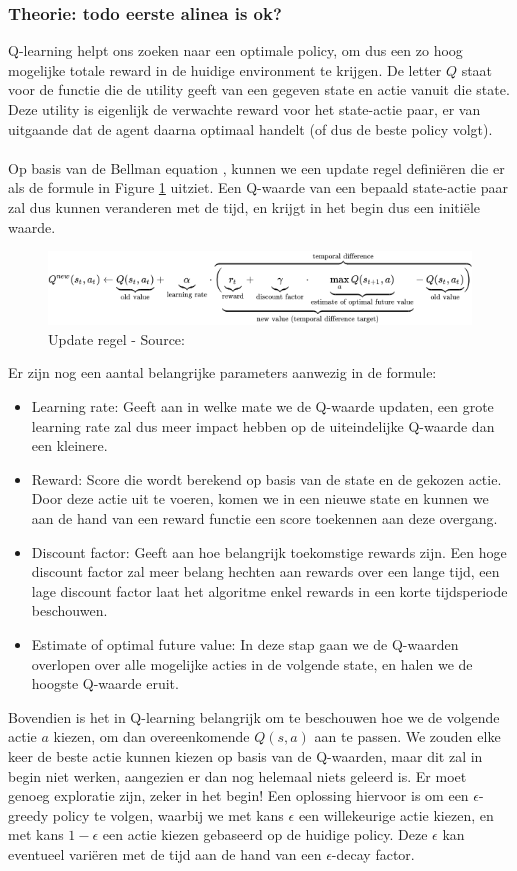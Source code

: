 \documentclass[11pt]{article}
\begin{document}
\subsubsection{Theorie: todo eerste alinea is ok?}
Q-learning helpt ons zoeken naar een optimale policy, om dus een zo hoog mogelijke totale reward in de huidige environment te krijgen. De letter $Q$ staat voor de functie die de utility geeft van een gegeven state en actie vanuit die state. Deze utility is eigenlijk de verwachte reward voor het state-actie paar, er van uitgaande dat de agent daarna optimaal handelt (of dus de beste policy volgt).\\\\
Op basis van de Bellman equation \cite{bellman-equations}, kunnen we een update regel definiëren die er als de formule in Figure \ref{fig:qfunction} uitziet. Een Q-waarde van een bepaald state-actie paar zal dus kunnen veranderen met de tijd, en krijgt in het begin dus een initiële waarde.
\begin{figure}[H]
\centering
\includegraphics[scale=0.70]{images/qformula.png}
\caption{Update regel - Source: \cite{q-learning}}
\label{fig:qfunction}
\end{figure}
\noindent Er zijn nog een aantal belangrijke parameters aanwezig in de formule: 
\begin{itemize}
	\item Learning rate: Geeft aan in welke mate we de Q-waarde updaten, een grote learning rate zal dus meer impact hebben op de uiteindelijke Q-waarde dan een kleinere.
	\item Reward: Score die wordt berekend op basis van de state en de gekozen actie. Door deze actie uit te voeren, komen we in een nieuwe state en kunnen we aan de hand van een reward functie een score toekennen aan deze overgang. 
	\item Discount factor: Geeft aan hoe belangrijk toekomstige rewards zijn. Een hoge discount factor zal meer belang hechten aan rewards over een lange tijd, een lage discount factor laat het algoritme enkel rewards in een korte tijdsperiode beschouwen.
	\item Estimate of optimal future value: In deze stap gaan we de Q-waarden overlopen over alle mogelijke acties in de volgende state, en halen we de hoogste Q-waarde eruit.
\end{itemize}
Bovendien is het in Q-learning belangrijk om te beschouwen hoe we de volgende actie $a$ kiezen, om dan overeenkomende $Q(s,a)$ aan te passen. We zouden elke keer de beste actie kunnen kiezen op basis van de Q-waarden, maar dit zal in begin niet werken, aangezien er dan nog helemaal niets geleerd is. Er moet genoeg exploratie zijn, zeker in het begin! Een oplossing hiervoor is om een $\epsilon$-greedy policy te volgen, waarbij we met kans $\epsilon$ een willekeurige actie kiezen, en met kans $1-\epsilon$ een actie kiezen gebaseerd op de huidige policy. Deze $\epsilon$ kan eventueel variëren met de tijd aan de hand van een $\epsilon$-decay factor.
\end{document}
